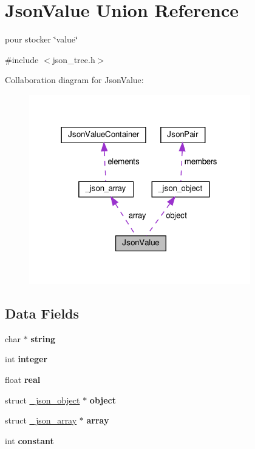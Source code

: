 \hypertarget{unionJsonValue}{}\section{Json\+Value Union Reference}
\label{unionJsonValue}


pour stocker \char`\"{}value\char`\"{}  




{\ttfamily \#include $<$json\+\_\+tree.\+h$>$}



Collaboration diagram for Json\+Value\+:\nopagebreak
\begin{figure}[H]
\begin{center}
\leavevmode
\includegraphics[width=273pt]{unionJsonValue__coll__graph}
\end{center}
\end{figure}
\subsection*{Data Fields}
\begin{DoxyCompactItemize}
\item 
\mbox{\label{unionJsonValue_abfc034211c14bf442394b50cd9bd25c3}} 
char $\ast$ {\bfseries string}
\item 
\mbox{\label{unionJsonValue_a8ad081bed26b75c17d904fe0259190ce}} 
int {\bfseries integer}
\item 
\mbox{\label{unionJsonValue_a7ab518d4c29bdc56ea65e72ba984872d}} 
float {\bfseries real}
\item 
\mbox{\label{unionJsonValue_a634382a792f07e862035cb971746c34d}} 
struct \hyperlink{struct__json__object}{\+\_\+json\+\_\+object} $\ast$ {\bfseries object}
\item 
\mbox{\label{unionJsonValue_a29a36d35245a375e447f14ee321d0011}} 
struct \hyperlink{struct__json__array}{\+\_\+json\+\_\+array} $\ast$ {\bfseries array}
\item 
\mbox{\label{unionJsonValue_a3c63422483d2ea2c4c3bff331c274cbe}} 
int {\bfseries constant}
\end{DoxyCompactItemize}


